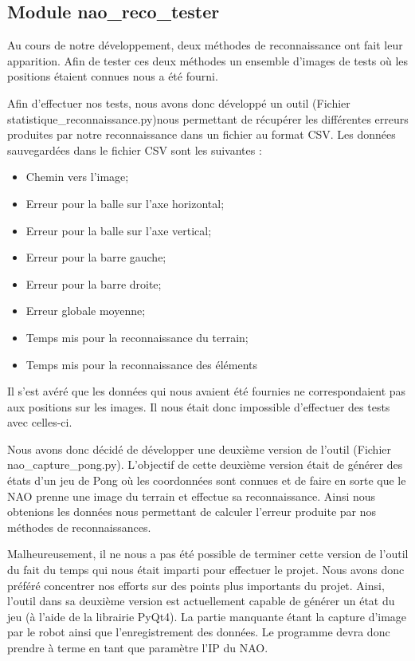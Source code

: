 \subsection{Module nao\_reco\_tester}
\label{sub:Module nao_reco_tester}
  \par Au cours de notre développement, deux méthodes de reconnaissance ont fait leur apparition.
  Afin de tester ces deux méthodes un ensemble d'images de tests où les positions étaient connues nous a été fourni.

  \par Afin d'effectuer nos tests, nous avons donc développé un outil (Fichier statistique\_reconnaissance.py)nous permettant de récupérer les différentes erreurs produites par notre reconnaissance dans un fichier au format CSV.
  Les données sauvegardées dans le fichier CSV sont les suivantes :

  \begin{itemize}
      \item Chemin vers l'image;
      \item Erreur pour la balle sur l'axe horizontal;
      \item Erreur pour la balle sur l'axe vertical;
      \item Erreur pour la barre gauche;
      \item Erreur pour la barre droite;
      \item Erreur globale moyenne;
      \item Temps mis pour la reconnaissance du terrain;
      \item Temps mis pour la reconnaissance des éléments
  \end{itemize}

  \par Il s'est avéré que les données qui nous avaient été fournies ne correspondaient pas aux positions sur les images.
  Il nous était donc impossible d'effectuer des tests avec celles-ci.

  \par Nous avons donc décidé de développer une deuxième version de l'outil (Fichier nao\_capture\_pong.py).
  L'objectif de cette deuxième version était de générer des états d'un jeu de Pong où les coordonnées sont connues et de faire en sorte que le NAO prenne une image du terrain et effectue sa reconnaissance.
  Ainsi nous obtenions les données nous permettant de calculer l'erreur produite par nos méthodes de reconnaissances.

  \par Malheureusement, il ne nous a pas été possible de terminer cette version de l'outil du fait du temps qui nous était imparti pour effectuer le projet.
  Nous avons donc préféré concentrer nos efforts sur des points plus importants du projet.
  Ainsi, l'outil dans sa deuxième version est actuellement capable de générer un état du jeu (à l'aide de la librairie PyQt4).
  La partie manquante étant la capture d'image par le robot ainsi que l'enregistrement des données.
  Le programme devra donc prendre à terme en tant que paramètre l'IP du NAO.

